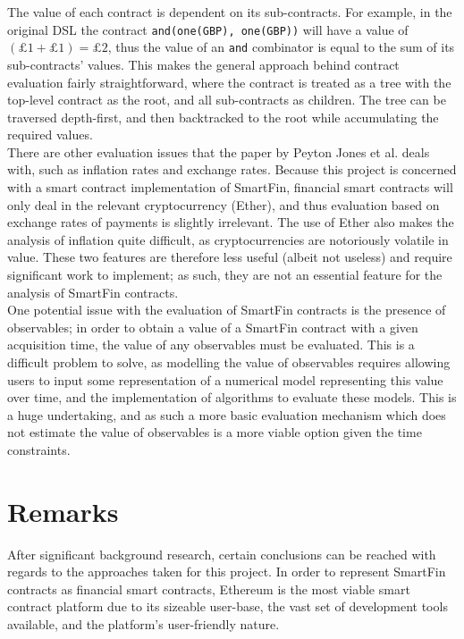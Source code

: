 The value of each contract is dependent on its sub-contracts. For example, in the original DSL the contract \texttt{and(one(GBP), one(GBP))} will have a value of $(£1 + £1) = £2$, thus the value of an \texttt{and} combinator is equal to the sum of its sub-contracts' values. This makes the general approach behind contract evaluation fairly straightforward, where the contract is treated as a tree with the top-level contract as the root, and all sub-contracts as children. The tree can be traversed depth-first, and then backtracked to the root while accumulating the required values. \\

There are other evaluation issues that the paper by Peyton Jones et al.\cite{SPJ} deals with, such as inflation rates and exchange rates. Because this project is concerned with a smart contract implementation of SmartFin, financial smart contracts will only deal in the relevant cryptocurrency (Ether), and thus evaluation based on exchange rates of payments is slightly irrelevant. The use of Ether also makes the analysis of inflation quite difficult, as cryptocurrencies are notoriously volatile in value. These two features are therefore less useful (albeit not useless) and require significant work to implement; as such, they are not an essential feature for the analysis of SmartFin contracts. \\

One potential issue with the evaluation of SmartFin contracts is the presence of observables; in order to obtain a value of a SmartFin contract with a given acquisition time, the value of any observables must be evaluated. This is a difficult problem to solve, as modelling the value of observables requires allowing users to input some representation of a numerical model representing this value over time, and the implementation of algorithms to evaluate these models. This is a huge undertaking, and as such a more basic evaluation mechanism which does not estimate the value of observables is a more viable option given the time constraints.


\section{Remarks}

After significant background research, certain conclusions can be reached with regards to the approaches taken for this project. In order to represent SmartFin contracts as financial smart contracts, Ethereum is the most viable smart contract platform due to its sizeable user-base, the vast set of development tools available, and the platform's user-friendly nature. \\

